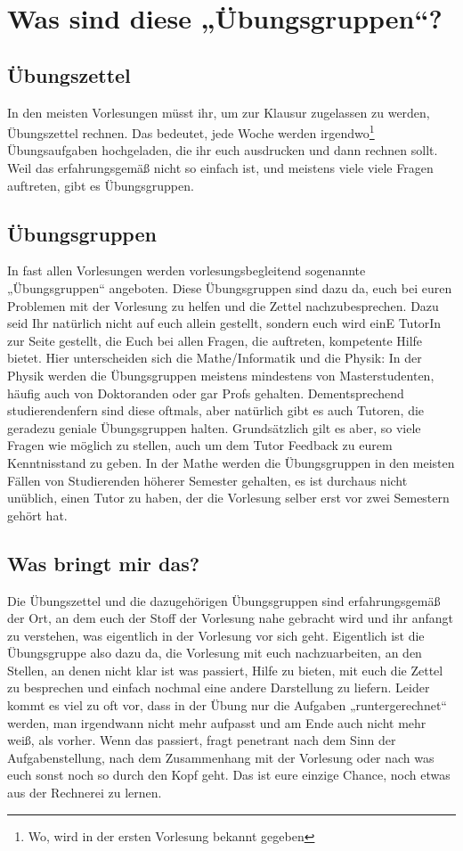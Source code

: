 \section{Was sind diese „Übungsgruppen“?}

\subsection{Übungszettel}
In den meisten Vorlesungen müsst ihr, um zur Klausur zugelassen zu werden, Übungszettel rechnen. Das bedeutet, jede Woche werden irgendwo\footnote{Wo, wird in der ersten Vorlesung bekannt gegeben} Übungsaufgaben hochgeladen, die ihr euch ausdrucken und dann rechnen sollt. Weil das erfahrungsgemäß nicht so einfach ist, und meistens viele viele Fragen auftreten, gibt es Übungsgruppen.

\subsection{Übungsgruppen}
In fast allen Vorlesungen werden vorlesungsbegleitend sogenannte „Übungsgruppen“ angeboten. Diese Übungsgruppen sind dazu da, euch bei euren Problemen mit der Vorlesung zu helfen und die Zettel nachzubesprechen. Dazu seid Ihr natürlich nicht auf euch allein gestellt, sondern euch wird einE TutorIn zur Seite gestellt, die Euch bei allen Fragen, die auftreten, kompetente Hilfe bietet. Hier unterscheiden sich die Mathe/Informatik und die Physik: In der Physik werden die Übungsgruppen meistens mindestens von Masterstudenten, häufig auch von Doktoranden oder gar Profs gehalten. Dementsprechend studierendenfern sind diese oftmals, aber natürlich gibt es auch Tutoren, die geradezu geniale Übungsgruppen halten. Grundsätzlich gilt es aber, so viele Fragen wie möglich zu stellen, auch um dem Tutor Feedback zu eurem Kenntnisstand zu geben. In der Mathe werden die Übungsgruppen in den meisten Fällen von Studierenden höherer Semester gehalten, es ist durchaus nicht unüblich, einen Tutor zu haben, der die Vorlesung selber erst vor zwei Semestern gehört hat.

\subsection{Was bringt mir das?}
Die Übungszettel und die dazugehörigen Übungsgruppen sind erfahrungsgemäß der Ort, an dem euch der Stoff der Vorlesung nahe gebracht wird und ihr anfangt zu verstehen, was eigentlich in der Vorlesung vor sich geht. Eigentlich ist die Übungsgruppe also dazu da, die Vorlesung mit euch nachzuarbeiten, an den Stellen, an denen nicht klar ist was passiert, Hilfe zu bieten, mit euch die Zettel zu besprechen und einfach nochmal eine andere Darstellung zu liefern. Leider kommt es viel zu oft vor, dass in der Übung nur die Aufgaben „runtergerechnet“ werden, man irgendwann nicht mehr aufpasst und am Ende auch nicht mehr weiß, als vorher. Wenn das passiert, fragt penetrant nach dem Sinn der Aufgabenstellung, nach dem Zusammenhang mit der Vorlesung oder nach was euch sonst noch so durch den Kopf geht. Das ist eure einzige Chance, noch etwas aus der Rechnerei zu lernen.

